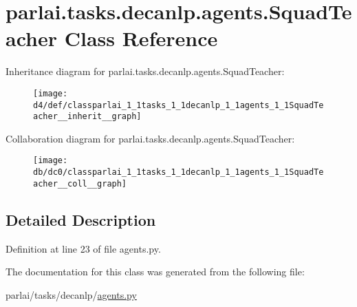 \hypertarget{classparlai_1_1tasks_1_1decanlp_1_1agents_1_1SquadTeacher}{}\section{parlai.\+tasks.\+decanlp.\+agents.\+Squad\+Teacher Class Reference}
\label{classparlai_1_1tasks_1_1decanlp_1_1agents_1_1SquadTeacher}


Inheritance diagram for parlai.\+tasks.\+decanlp.\+agents.\+Squad\+Teacher\+:
\nopagebreak
\begin{figure}[H]
\begin{center}
\leavevmode
\texttt{[image: d4/def/classparlai\_1\_1tasks\_1\_1decanlp\_1\_1agents\_1\_1SquadTeacher\_\_inherit\_\_graph]}
\end{center}
\end{figure}


Collaboration diagram for parlai.\+tasks.\+decanlp.\+agents.\+Squad\+Teacher\+:
\nopagebreak
\begin{figure}[H]
\begin{center}
\leavevmode
\texttt{[image: db/dc0/classparlai\_1\_1tasks\_1\_1decanlp\_1\_1agents\_1\_1SquadTeacher\_\_coll\_\_graph]}
\end{center}
\end{figure}


\subsection{Detailed Description}


Definition at line 23 of file agents.\+py.



The documentation for this class was generated from the following file\+:\begin{DoxyCompactItemize}
\item 
parlai/tasks/decanlp/\hyperlink{parlai_2tasks_2decanlp_2agents_8py}{agents.\+py}\end{DoxyCompactItemize}
